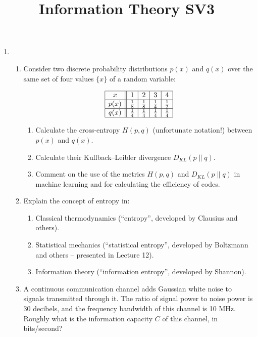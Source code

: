 \documentclass[11pt,a4paper]{article}
\title{Information Theory SV3}
\author{}
\date{}
\begin{document}
\maketitle

\begin{enumerate}

\item
\begin{enumerate}
    \item Consider two discrete probability distributions $p(x)$ and $q(x)$ over the same set of four values $\{x\}$ of a random variable:

    \[
    \begin{array}{|c||c|c|c|c|}
    \hline
    x & 1 & 2 & 3 & 4 \\
    \hline
    p(x) & \tfrac{1}{8} & \tfrac{1}{8} & \tfrac{1}{4} & \tfrac{1}{2} \\ \hline
    q(x) & \tfrac{1}{4} & \tfrac{1}{4} & \tfrac{1}{4} & \tfrac{1}{4} \\ \hline
    \end{array}
    \]

    \begin{enumerate}
        \item Calculate the cross-entropy $H(p, q)$ (unfortunate notation!) between $p(x)$ and $q(x)$.
        \item Calculate their Kullback–Leibler divergence $D_{KL}(p \| q)$.
        \item Comment on the use of the metrics $H(p, q)$ and $D_{KL}(p \| q)$ in machine learning and for calculating the efficiency of codes.
    \end{enumerate}

    \item Explain the concept of entropy in:
    \begin{enumerate}
        \item Classical thermodynamics (“entropy”, developed by Clausius and others).
        \item Statistical mechanics (“statistical entropy”, developed by Boltzmann and others – presented in Lecture 12).
        \item Information theory (“information entropy”, developed by Shannon).
    \end{enumerate}

    \item A continuous communication channel adds Gaussian white noise to signals transmitted through it.  
    The ratio of signal power to noise power is 30 decibels, and the frequency bandwidth of this channel is 10 MHz.  
    Roughly what is the information capacity $C$ of this channel, in bits/second?


\end{enumerate}
\end{enumerate}
\end{document}
